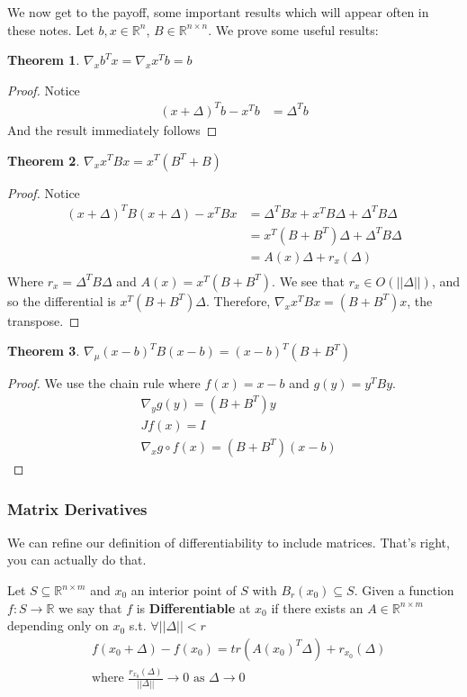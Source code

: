 \documentclass[]{article}
\theoremstyle{mattstyle}
\newtheorem{theorem}{Theorem}[section]
\theoremstyle{definition}
\begin{document}
We now get to the payoff, some important results which will appear often in these notes. Let $b,x \in \mathbb{R}^n$, $B \in \mathbb{R}^{n \times n}$. We prove some useful results:

\begin{theorem}
	$\nabla_{x} b^Tx = \nabla_{x} x^Tb= b$
\end{theorem}
\begin{proof}
	Notice 
	\begin{align*}
	(x+\Delta)^Tb - x^Tb &= \Delta^Tb
	\end{align*}
	And the result immediately follows
\end{proof}

\begin{theorem}
	$\nabla_{x} x^TBx = x^T(B^T+B)$
\end{theorem}
\begin{proof}
	Notice 
	\begin{align*}
	(x+\Delta)^TB(x+\Delta) - x^TBx &= \Delta^TBx + x^TB\Delta + \Delta^TB\Delta\\
	&= x^T(B + B^T)\Delta + \Delta^TB\Delta\\
	&= A(x)\Delta + r_{x}(\Delta)\\
	\end{align*}
	Where $r_{x}=\Delta^TB\Delta$ and $A(x)=x^T(B + B^T)$. We see that $r_{x}\in O(||\Delta||)$, and so the differential is $x^T(B + B^T)\Delta$. Therefore, $\nabla_x x^TBx = (B + B^T)x$, the transpose.
\end{proof}

\begin{theorem}
	$\nabla_{\mu} (x-b)^TB(x-b) = (x-b)^T(B+B^T)$
\end{theorem}
\begin{proof}
	We use the chain rule where $f(x)=x-b$ and $g(y)=y^TBy$.
	\begin{align*}
	&\nabla_{y}g(y) = (B + B^T)y\\
	&Jf(x) = I \\
	&\nabla_{x} g \circ f(x) = (B + B^T)(x-b)
	\end{align*}
\end{proof}

\subsubsection{Matrix Derivatives}
We can refine our definition of differentiability to include matrices. That's right, you can actually do that.

Let $S \subseteq \mathbb{R}^{n \times m}$ and $x_0$ an interior point of $S$ with $B_r(x_0) \subseteq S$. Given a function $f: S \rightarrow \mathbb{R}$ we say that $f$ is \textbf{Differentiable} at $x_0$ if there exists an $A \in \mathbb{R}^{n \times m}$ depending only on $x_0$ s.t. $\forall ||\Delta|| < r$
\begin{align*}
&f(x_0 + \Delta) - f(x_0) = tr(A(x_0)^T\Delta) + r_{x_0}(\Delta)\\
&\text{where $\frac{r_{x_0}(\Delta)}{||\Delta||}\rightarrow 0$ as $\Delta \rightarrow 0$}
\end{align*}
\end{document}

